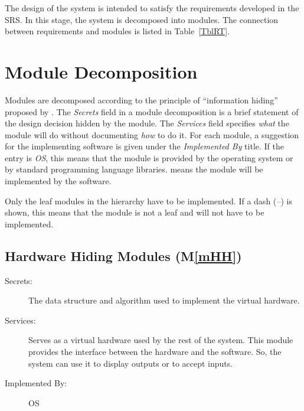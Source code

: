\documentclass[12pt, titlepage]{article}
\newcommand{\mref}[1]{M\ref{#1}}
\begin{document}
The design of the system is intended to satisfy the requirements developed in
the SRS. In this stage, the system is decomposed into modules. The connection
between requirements and modules is listed in Table~\ref{TblRT}.


\section{Module Decomposition} \label{SecMD}

Modules are decomposed according to the principle of ``information hiding''
proposed by \citet{ParnasEtAl1984}. The \emph{Secrets} field in a module
decomposition is a brief statement of the design decision hidden by the
module. The \emph{Services} field specifies \emph{what} the module will do
without documenting \emph{how} to do it. For each module, a suggestion for the
implementing software is given under the \emph{Implemented By} title. If the
entry is \emph{OS}, this means that the module is provided by the operating
system or by standard programming language libraries.  \emph{\progname{}} means the
module will be implemented by the \progname{} software.

Only the leaf modules in the hierarchy have to be implemented. If a dash
(\emph{--}) is shown, this means that the module is not a leaf and will not have
to be implemented.

\subsection{Hardware Hiding Modules (\mref{mHH})}

\begin{description}
\item[Secrets:]The data structure and algorithm used to implement the virtual
  hardware.
\item[Services:]Serves as a virtual hardware used by the rest of the
  system. This module provides the interface between the hardware and the
  software. So, the system can use it to display outputs or to accept inputs.
\item[Implemented By:] OS
\end{description}
\end{document}
